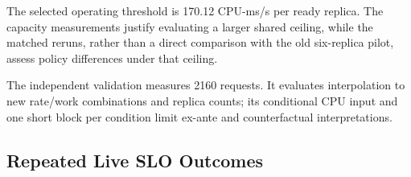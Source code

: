 \documentclass[10pt,twocolumn,a4paper]{article}
\begin{document}
The selected operating threshold is 170.12 CPU-ms/s per ready replica. The capacity measurements justify evaluating a larger shared ceiling, while the matched reruns, rather than a direct comparison with the old six-replica pilot, assess policy differences under that ceiling.

\begin{table}[t]\centering\small\setlength{\tabcolsep}{3pt}
\caption{Independent response mapping at eighteen new load/work/replica combinations, using realized CPU input. Screening an operating point as safe is not a guarantee for future traffic.}\label{tab:fidelity}
\ifdim\wd\databox>\columnwidth\relax\resizebox{\columnwidth}{!}{\usebox{\databox}}\else\usebox{\databox}\fi
\end{table}

The independent validation measures 2160 requests. It evaluates interpolation to new rate/work combinations and replica counts; its conditional CPU input and one short block per condition limit ex-ante and counterfactual interpretations.

\subsection{Repeated Live SLO Outcomes}
\end{document}
